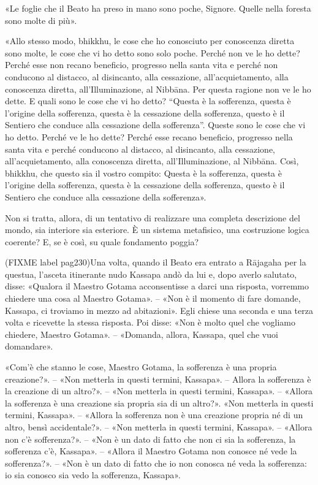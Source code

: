 «Le foglie che il Beato ha preso in mano sono poche, Signore. Quelle
nella foresta sono molte di più».


«Allo stesso modo, bhikkhu, le cose che ho conosciuto per conoscenza
diretta sono molte, le cose che vi ho detto sono solo poche. Perché non
ve le ho dette? Perché esse non recano beneficio, progresso nella santa
vita e perché non conducono al distacco, al disincanto, alla cessazione,
all’acquietamento, alla conoscenza diretta, all’Illuminazione, al
Nibbāna. Per questa ragione non ve le ho dette. E quali sono le cose che
vi ho detto? “Questa è la sofferenza, questa è l’origine della
sofferenza, questa è la cessazione della sofferenza, questo è il
Sentiero che conduce alla cessazione della sofferenza”. Queste sono le
cose che vi ho detto. Perché ve le ho dette? Perché esse recano
beneficio, progresso nella santa vita e perché conducono al distacco, al
disincanto, alla cessazione, all’acquietamento, alla conoscenza diretta,
all’Illuminazione, al Nibbāna. Così, bhikkhu, che questo sia il vostro
compito: Questa è la sofferenza, questa è l’origine della sofferenza,
questa è la cessazione della sofferenza, questo è il Sentiero che
conduce alla cessazione della sofferenza».




 Non si tratta, allora, di un tentativo di realizzare
una completa descrizione del mondo, sia interiore sia esteriore. È un
sistema metafisico, una costruzione logica coerente? E, se è così, su
quale fondamento poggia?


 (FIXME label pag230)Una volta, quando il Beato era entrato a Rājagaha per la
questua, l’asceta itinerante nudo Kassapa andò da lui e, dopo averlo
salutato, disse: «Qualora il Maestro Gotama acconsentisse a darci una
risposta, vorremmo chiedere una cosa al Maestro Gotama». – «Non è il
momento di fare domande, Kassapa, ci troviamo in mezzo ad abitazioni».
Egli chiese una seconda e una terza volta e ricevette la stessa
risposta. Poi disse: «Non è molto quel che vogliamo chiedere, Maestro
Gotama». – «Domanda, allora, Kassapa, quel che vuoi domandare».


«Com’è che stanno le cose, Maestro Gotama, la sofferenza è una propria
creazione?». – «Non metterla in questi termini, Kassapa». – Allora la
sofferenza è la creazione di un altro?». – «Non metterla in questi
termini, Kassapa». – «Allora la sofferenza è una creazione sia propria
sia di un altro?». «Non metterla in questi termini, Kassapa». – «Allora
la sofferenza non è una creazione propria né di un altro, bensì
accidentale?». – «Non metterla in questi termini, Kassapa». – «Allora
non c’è sofferenza?». – «Non è un dato di fatto che non ci sia la
sofferenza, la sofferenza c’è, Kassapa». – «Allora il Maestro Gotama non
conosce né vede la sofferenza?». – «Non è un dato di fatto che io non
conosca né veda la sofferenza: io sia conosco sia vedo la sofferenza,
Kassapa».


